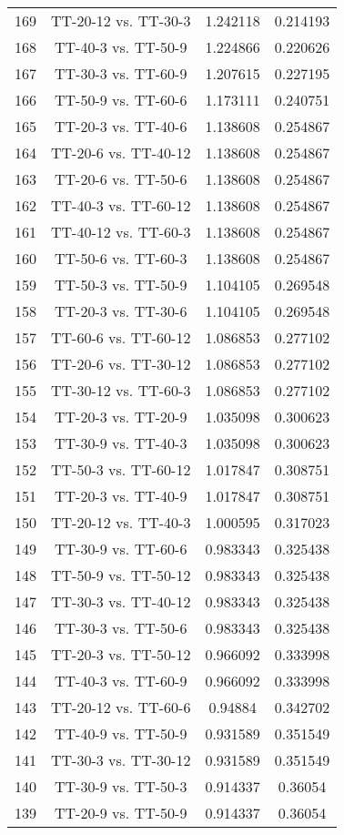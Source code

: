 \documentclass[a4paper,10pt]{article}
\begin{document}
\begin{landscape}
\begin{table}[!htp]
\begin{tabular}{cccc}
169&TT-20-12 vs. TT-30-3&1.242118&0.214193\\
168&TT-40-3 vs. TT-50-9&1.224866&0.220626\\
167&TT-30-3 vs. TT-60-9&1.207615&0.227195\\
166&TT-50-9 vs. TT-60-6&1.173111&0.240751\\
165&TT-20-3 vs. TT-40-6&1.138608&0.254867\\
164&TT-20-6 vs. TT-40-12&1.138608&0.254867\\
163&TT-20-6 vs. TT-50-6&1.138608&0.254867\\
162&TT-40-3 vs. TT-60-12&1.138608&0.254867\\
161&TT-40-12 vs. TT-60-3&1.138608&0.254867\\
160&TT-50-6 vs. TT-60-3&1.138608&0.254867\\
159&TT-50-3 vs. TT-50-9&1.104105&0.269548\\
158&TT-20-3 vs. TT-30-6&1.104105&0.269548\\
157&TT-60-6 vs. TT-60-12&1.086853&0.277102\\
156&TT-20-6 vs. TT-30-12&1.086853&0.277102\\
155&TT-30-12 vs. TT-60-3&1.086853&0.277102\\
154&TT-20-3 vs. TT-20-9&1.035098&0.300623\\
153&TT-30-9 vs. TT-40-3&1.035098&0.300623\\
152&TT-50-3 vs. TT-60-12&1.017847&0.308751\\
151&TT-20-3 vs. TT-40-9&1.017847&0.308751\\
150&TT-20-12 vs. TT-40-3&1.000595&0.317023\\
149&TT-30-9 vs. TT-60-6&0.983343&0.325438\\
148&TT-50-9 vs. TT-50-12&0.983343&0.325438\\
147&TT-30-3 vs. TT-40-12&0.983343&0.325438\\
146&TT-30-3 vs. TT-50-6&0.983343&0.325438\\
145&TT-20-3 vs. TT-50-12&0.966092&0.333998\\
144&TT-40-3 vs. TT-60-9&0.966092&0.333998\\
143&TT-20-12 vs. TT-60-6&0.94884&0.342702\\
142&TT-40-9 vs. TT-50-9&0.931589&0.351549\\
141&TT-30-3 vs. TT-30-12&0.931589&0.351549\\
140&TT-30-9 vs. TT-50-3&0.914337&0.36054\\
139&TT-20-9 vs. TT-50-9&0.914337&0.36054\\

\end{tabular}
\end{table}
\end{landscape}
\end{document}
